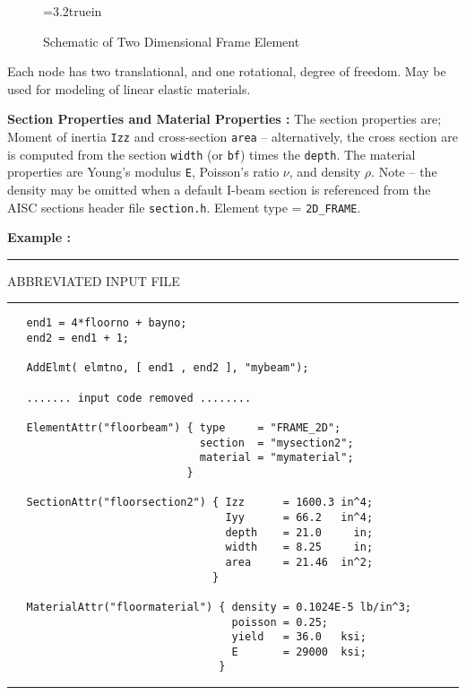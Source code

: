 \begin{figure} [ht]
\epsfxsize=3.2truein
\centerline{}
\caption{Schematic of Two Dimensional Frame Element}
\label{fig:fe-2d-frame}
\end{figure}

\vspace{0.15 in}\noindent
Each node has two translational, and one rotational, degree of freedom.
May be used for modeling of linear elastic materials.  

\vspace{0.15 in}\noindent
{\bf Section Properties and Material Properties :} 
The section properties are; Moment of inertia {\tt Izz}
and cross-section {\tt area} -- alternatively,
the cross section are is computed from the
section {\tt width} (or {\tt bf}) times the {\tt depth}.
The material properties are Young's modulus {\tt E},
Poisson's ratio $\nu$, and density $\rho$.
Note -- the density may be omitted when a default I-beam section
is referenced from the AISC sections header file {\tt section.h}.
Element type = {\tt 2D\_FRAME}.

\vspace{0.15 in}\noindent
{\bf Example :} 

\vspace{0.10 in}
\begin{footnotesize}
\noindent
{\rule{2.1 in}{0.035 in} ABBREVIATED INPUT FILE \rule{2.1 in}{0.035 in} }
\begin{verbatim}
   end1 = 4*floorno + bayno;
   end2 = end1 + 1;

   AddElmt( elmtno, [ end1 , end2 ], "mybeam");

   ....... input code removed ........

   ElementAttr("floorbeam") { type     = "FRAME_2D";
                              section  = "mysection2";
                              material = "mymaterial";
                            }

   SectionAttr("floorsection2") { Izz      = 1600.3 in^4;
                                  Iyy      = 66.2   in^4;
                                  depth    = 21.0     in;
                                  width    = 8.25     in;
                                  area     = 21.46  in^2;
                                }

   MaterialAttr("floormaterial") { density = 0.1024E-5 lb/in^3;
                                   poisson = 0.25;
                                   yield   = 36.0   ksi;
                                   E       = 29000  ksi;
                                 }
\end{verbatim}
\rule{6.25 in}{0.035 in}
\end{footnotesize}

